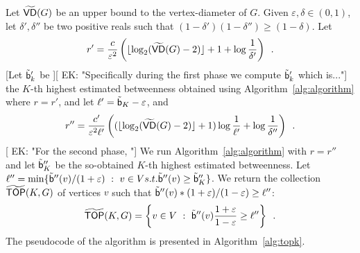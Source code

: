 Let $\widetilde{\mathsf{VD}}(G)$ be an upper bound to the vertex-diameter of $G$. Given
$\varepsilon,\delta\in(0,1)$, let $\delta',\delta''$ be two positive reals such
that $(1-\delta')(1-\delta'')\ge(1-\delta)$. Let
\[
r'=\frac{c}{\varepsilon^2}\left(\lfloor\log_2(\widetilde{\mathsf{VD}}(G)-2)\rfloor+1+\log\frac{1}{\delta'}\right)\enspace.
\]
[Let $\tilde{\mathsf{b}}'_k$ be ][ EK: "Specifically during the first phase we compute $\tilde{\mathsf{b}}'_k$ which is..."] the $K$-th highest estimated betweenness obtained using
Algorithm~\ref{alg:algorithm} where $r=r'$, and let
  $\ell'=\tilde{\mathsf{b}}_K-\varepsilon$, %
and
\[
r''=\frac{c'}{\varepsilon^2\ell'}\left((\lfloor\log_2(\widetilde{\mathsf{VD}}(G)-2)\rfloor+1)\log\frac{1}{\ell'}+\log\frac{1}{\delta''}\right)\enspace.
\]
[ EK: "For the second phase, "] We run Algorithm~\ref{alg:algorithm} with $r=r''$ and let $\tilde{\mathsf{b}}''_K$ be
the so-obtained $K$-th highest estimated betweenness. Let
$\ell''=\min\{\tilde{\mathsf{b}}''(v) / (1+\varepsilon) ~:~ v\in V \relax{ s.t. }
\tilde{\mathsf{b}}''(v)\ge\tilde{\mathsf{b}}''_K\}$. We
return the collection $\widetilde{\mathsf{TOP}}(K,G)$ of vertices $v$ such that
$\tilde{\mathsf{b}}''(v)*(1+\varepsilon)/(1-\varepsilon)\ge\ell''$:
\[
\widetilde{\mathsf{TOP}}(K,G)= \left\{v\in V ~:~
\tilde{\mathsf{b}}''(v)\frac{1+\varepsilon}{1-\varepsilon}\ge\ell''\right\}\enspace.
\]
\ifproof
The pseudocode of the algorithm is presented in Algorithm~\ref{alg:topk}.

